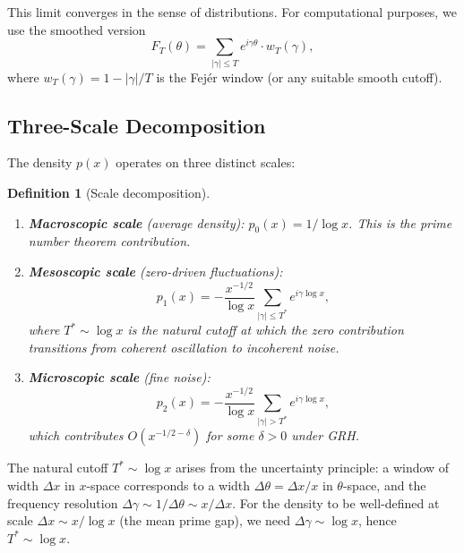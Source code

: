 \documentclass[11pt,a4paper]{article}
\newtheorem{definition}[theorem]{Definition}
\theoremstyle{remark}
\begin{document}
This limit converges in the sense of distributions.
For computational purposes, we use the smoothed version
\begin{equation}\label{eq:spectral_smooth}
F_T(\theta) = \sum_{|\gamma|\le T} e^{i\gamma \theta} \cdot w_T(\gamma),
\end{equation}
where $w_T(\gamma) = 1 - |\gamma|/T$ is the Fej\'er window (or any suitable smooth cutoff).

\subsection{Three-Scale Decomposition}

The density $p(x)$ operates on three distinct scales:

\begin{definition}[Scale decomposition]\label{def:scales}
\begin{enumerate}
\item \textbf{Macroscopic scale} (average density): $p_0(x) = 1/\log x$.
This is the prime number theorem contribution.

\item \textbf{Mesoscopic scale} (zero-driven fluctuations):
\begin{equation}\label{eq:mesoscopic}
p_1(x) = -\frac{x^{-1/2}}{\log x} \sum_{|\gamma| \le T^*} e^{i\gamma \log x},
\end{equation}
where $T^* \sim \log x$ is the \emph{natural cutoff} at which the zero contribution transitions from coherent oscillation to incoherent noise.

\item \textbf{Microscopic scale} (fine noise):
\begin{equation}\label{eq:microscopic}
p_2(x) = -\frac{x^{-1/2}}{\log x} \sum_{|\gamma| > T^*} e^{i\gamma \log x},
\end{equation}
which contributes $O(x^{-1/2-\delta})$ for some $\delta > 0$ under GRH.
\end{enumerate}
\end{definition}

The natural cutoff $T^* \sim \log x$ arises from the uncertainty principle: a window of width $\Delta x$ in $x$-space corresponds to a width $\Delta \theta = \Delta x / x$ in $\theta$-space, and the frequency resolution $\Delta \gamma \sim 1/\Delta \theta \sim x/\Delta x$.
For the density to be well-defined at scale $\Delta x \sim x/\log x$ (the mean prime gap), we need $\Delta \gamma \sim \log x$, hence $T^* \sim \log x$.
\end{document}
